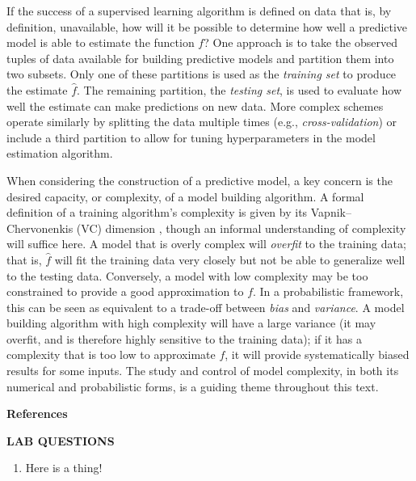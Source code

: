 \documentclass[12pt,hidelinks]{article}
\numberwithin{equation}{section}
\begin{document}
If the success of a supervised learning algorithm is defined on data that is,
by definition, unavailable, how will it be possible to determine how well a
predictive model is able to estimate the function $f$? One approach is to take
the observed tuples of data available for building predictive models and
partition them into two subsets. Only one of these partitions is used as the
\textit{training set} to produce the estimate $\widehat{f}$. The remaining
partition, the \textit{testing set}, is used to evaluate how well the estimate
can make predictions on new data. More complex schemes operate similarly by
splitting the data multiple times (e.g., \textit{cross-validation}) or
include a third partition to allow for tuning hyperparameters in the model
estimation algorithm.

When considering the construction of a predictive model, a key concern is the
desired capacity, or complexity, of a model building
algorithm. A formal definition
of a training algorithm's complexity is given by its Vapnik--Chervonenkis (VC)
dimension \cite{vapnik1971uniform}, though an informal understanding of
complexity will suffice here. A model that is overly complex will
\textit{overfit} to the training data; that is, $\widehat{f}$ will fit the
training data very closely but not be able to generalize well to the testing
data. Conversely, a model with low complexity may be too constrained to
provide a good approximation to $f$. In a probabilistic framework, this can
be seen as equivalent to a trade-off between \textit{bias} and
\textit{variance}. A model building algorithm with high complexity will have
a large variance (it may overfit, and is therefore highly sensitive to the
training data); if it has a complexity that is too low to approximate $f$, it
will provide systematically biased results for some inputs. The study and
control of model complexity, in both its numerical and probabilistic forms,
is a guiding theme throughout this text.

\renewcommand{\section}[2]{}%
\vspace{12pt}
\textbf{References}


\newpage

\textbf{LAB QUESTIONS}

\vspace*{0pt}

\begin{enumerate}
\item Here is a thing!
\end{enumerate}
\end{document}
